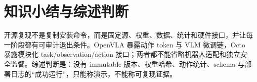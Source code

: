 \section{知识小结与综述判断}

开源复现不是复制安装命令，而是固定源、权重、数据、统计和硬件接口，并让每一阶段都有可审计退出条件。OpenVLA 暴露动作 token 与 VLM 微调链，Octo 暴露模块化 task/observation/action 接口；两者都不能省略机器人适配和独立安全监督。综述判断是：没有 immutable 版本、权重哈希、动作统计、schema 与部署日志的“成功运行”，只能称演示，不能称可复现证据。
